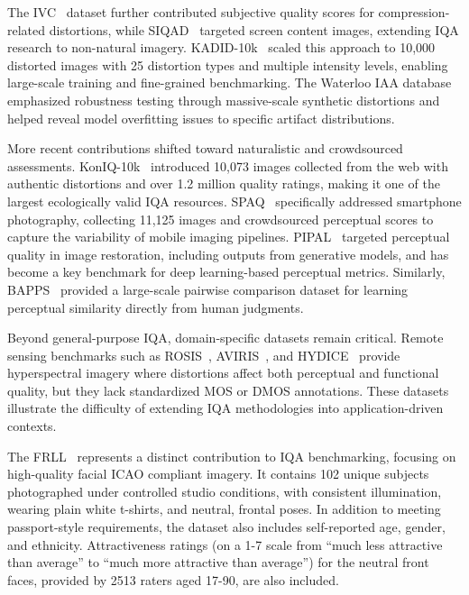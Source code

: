 The IVC~\cite{ivc} dataset further contributed subjective quality scores for compression-related distortions, while SIQAD~\cite{siqad} targeted screen content images, extending \acs{IQA} research to non-natural imagery. KADID-10k~\cite{lin2019kadid} scaled this approach to 10,000 distorted images with 25 distortion types and multiple intensity levels, enabling large-scale training and fine-grained benchmarking. The Waterloo IAA database~\cite{waterloo} emphasized robustness testing through massive-scale synthetic distortions and helped reveal model overfitting issues to specific artifact distributions.

More recent contributions shifted toward naturalistic and crowdsourced assessments. KonIQ-10k~\cite{koniq10k} introduced 10,073 images collected from the web with authentic distortions and over 1.2 million quality ratings, making it one of the largest ecologically valid \acs{IQA} resources. SPAQ~\cite{spaq} specifically addressed smartphone photography, collecting 11,125 images and crowdsourced perceptual scores to capture the variability of mobile imaging pipelines. PIPAL~\cite{pipal} targeted perceptual quality in image restoration, including outputs from generative models, and has become a key benchmark for deep learning-based perceptual metrics. Similarly, BAPPS~\cite{bapps} provided a large-scale pairwise comparison dataset for learning perceptual similarity directly from human judgments.

Beyond general-purpose \acs{IQA}, domain-specific datasets remain critical. Remote sensing benchmarks such as ROSIS~\cite{rosis}, AVIRIS~\cite{aviris}, and HYDICE~\cite{hydice} provide hyperspectral imagery where distortions affect both perceptual and functional quality, but they lack standardized \acs{MOS} or \acs{DMOS} annotations. These datasets illustrate the difficulty of extending \acs{IQA} methodologies into application-driven contexts.

The \acf{FRLL}~\cite{frll} represents a distinct contribution to IQA benchmarking, focusing on high-quality facial \acs{ICAO} compliant imagery. It contains 102 unique subjects photographed under controlled studio conditions, with consistent illumination, wearing plain white t-shirts, and neutral, frontal poses. In addition to meeting passport-style requirements, the dataset also includes self-reported age, gender, and ethnicity. Attractiveness ratings (on a 1-7 scale from “much less attractive than average” to “much more attractive than average”) for the neutral front faces, provided by 2513 raters aged 17-90, are also included.

